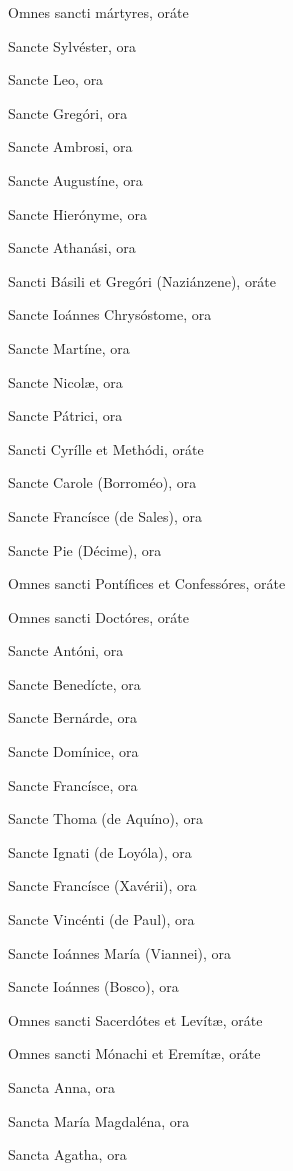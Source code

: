 \documentclass[12pt,a6paper]{book}
\begin{document}
\begin{sloppy}
Omnes sancti mártyres, oráte

\vspace{3mm}

Sancte Sylvéster, ora

Sancte Leo, ora

Sancte Gregóri, ora

Sancte Ambrosi, ora

Sancte Augustíne, ora

Sancte Hierónyme, ora

Sancte Athanási, ora

Sancti Básili et Gregóri (Naziánzene), oráte

Sancte Ioánnes Chrysóstome, ora

Sancte Martíne, ora

Sancte Nicolæ, ora

Sancte Pátrici, ora

Sancti Cyrílle et Methódi, oráte

Sancte Carole (Borroméo), ora

Sancte Francísce (de Sales), ora

Sancte Pie (Décime), ora

Omnes sancti Pontífices et Confessóres, oráte

Omnes sancti Doctóres, oráte

\vspace{3mm}

Sancte Antóni, ora

Sancte Benedícte, ora

Sancte Bernárde, ora

Sancte Domínice, ora

Sancte Francísce, ora

Sancte Thoma (de Aquíno), ora

Sancte Ignati (de Loyóla), ora

Sancte Francísce (Xavérii), ora

Sancte Vincénti (de Paul), ora

Sancte Ioánnes María (Viannei), ora

Sancte Ioánnes (Bosco), ora

Omnes sancti Sacerdótes et Levítæ, oráte

Omnes sancti Mónachi et Eremítæ, oráte

\vspace{3mm}

Sancta Anna, ora

Sancta María Magdaléna, ora

Sancta Agatha, ora


\end{sloppy}
\end{document}
